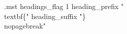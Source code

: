 \AtBeginDocument{%
\renewcommand{\chapterautorefname}{Chap.}
\renewcommand{\sectionautorefname}{Sect.}
\renewcommand{\subsectionautorefname}{Sect.}
\renewcommand{\figureautorefname}{Fig.}
\newcommand{\definitionautorefname}{Def.}
\newcommand{\algorithmautorefname}{Algo.}
\newcommand{\notationautorefname}{Notation}}


\renewcommand{\glsdescwidth}{16cm}

\makeatletter
\renewenvironment{theindex}
{{\chapter{\indexname}\label{sec:app:index}}\par%
\@mkboth{\MakeUppercase\indexname}{\MakeUppercase\indexname}%
\parindent\z@
\parskip\z@ \@plus .3\p@\relax
\let\item\@idxitem
\setlength{\columnsep}{20pt}
\begin{multicols}{2}}
{\end{multicols}}
\makeatother
\begin{filecontents}{\jobname.mst}
headings_flag 1
heading_prefix "\\textbf\{"
heading_suffix "\}\\nopagebreak\n"
\end{filecontents}
